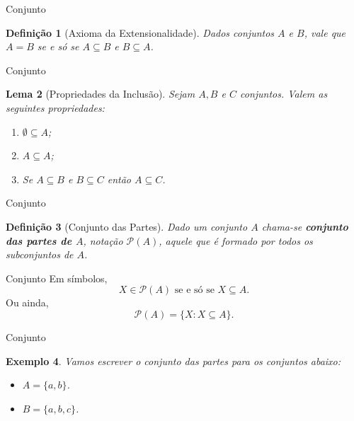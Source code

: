\documentclass[10pt]{beamer}
\renewcommand{\indent}{\hspace*{2em}}
\theoremstyle{plain}
\newtheorem{defn}{Definição}[section]
\newtheorem{lem}[defn]{Lema}
\newtheorem{ex}[defn]{Exemplo}
\begin{document}
\begin{frame}{Conjunto}
\begin{defn}[Axioma da Extensionalidade]
\vfill\indent Dados conjuntos $A$ e $B$, vale que $A=B$ se e só se $A\subseteq B$ e $B\subseteq A$.
\end{defn}
\end{frame}

\begin{frame}{Conjunto}
\begin{lem}[Propriedades da Inclusão]
\vfill\indent Sejam $A,B$ e $C$ conjuntos. Valem as seguintes propriedades:
\begin{enumerate}[i -]
    \item $\emptyset\subseteq A$;
    \item $A\subseteq A$;
    \item Se $A\subseteq B$ e $B\subseteq C$ então $A\subseteq C$.
\end{enumerate}
\end{lem}
\end{frame}

\begin{frame}{Conjunto}
\begin{defn}[Conjunto das Partes]
\vfill\indent Dado um conjunto $A$ chama-se \textbf{conjunto das partes de $A$}, notação $\mathcal P(A)$, aquele que é formado por todos os subconjuntos de $A$.
\end{defn}
\end{frame}

\begin{frame}{Conjunto}
\indent Em símbolos,
$$X\in\mathcal P(A)\mbox{ se e só se }X\subseteq A.$$
Ou ainda,
$$\mathcal P(A)=\{X:X\subseteq A\}.$$
\end{frame}

\begin{frame}{Conjunto}
\begin{ex}
\indent Vamos escrever o conjunto das partes para os conjuntos abaixo:
 \begin{itemize}
     \item $A=\{a,b\}$.
     \item $B=\{a,b,c\}$.
 \end{itemize}
\end{ex}
\end{frame}
\end{document}
